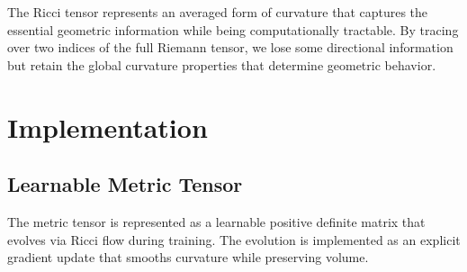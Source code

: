 \documentclass[12pt,a4paper]{article}
\begin{document}
The Ricci tensor represents an averaged form of curvature that captures the essential geometric information while being computationally tractable. By tracing over two indices of the full Riemann tensor, we lose some directional information but retain the global curvature properties that determine geometric behavior.

\section{Implementation}

\subsection{Learnable Metric Tensor}

The metric tensor is represented as a learnable positive definite matrix that evolves via Ricci flow during training. The evolution is implemented as an explicit gradient update that smooths curvature while preserving volume.
\end{document}
